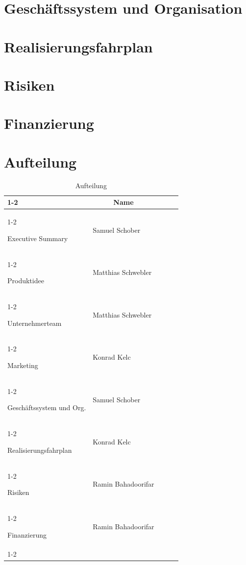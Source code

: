 \documentclass[11pt]{article}
\begin{document}
\section{Gesch\"aftssystem und Organisation}
\section{Realisierungsfahrplan}
\section{Risiken}
\section{Finanzierung}

\newpage
\section{Aufteilung}
\begin{table}[ht]
	\centering
	\begin{tabular}{|l|l|lll}
		\cline{1-2}
		\multicolumn{1}{|c|}{\textbf{\rule{0pt}{3ex} Thema}} & \multicolumn{1}{c|}{\textbf{Name}} &  &  &  \\ \cline{1-2}
		
		\rule{0pt}{3ex} Executive Summary                    & Samuel Schober                     &  &  &  \\ \cline{1-2}
		\rule{0pt}{3ex} Produktidee                          & Matthias Schwebler                 &  &  &  \\ \cline{1-2}
		\rule{0pt}{3ex} Unternehmerteam                      & Matthias Schwebler                 &  &  &  \\ \cline{1-2}
		\rule{0pt}{3ex} Marketing                            & Konrad Kelc                        &  &  &  \\ \cline{1-2}
		\rule{0pt}{3ex} Gesch\"aftssystem und Org.             & Samuel Schober                     &  &  &  \\ \cline{1-2}
		\rule{0pt}{3ex} Realisierungsfahrplan                & Konrad Kelc                        &  &  &  \\ \cline{1-2}
		\rule{0pt}{3ex} Risiken                              & Ramin Bahadoorifar                 &  &  &  \\ \cline{1-2}
		\rule{0pt}{3ex} Finanzierung                         & Ramin Bahadoorifar                 &  &  &  \\ \cline{1-2}
	\end{tabular}
	\caption{Aufteilung}
\end{table}
\end{document}
